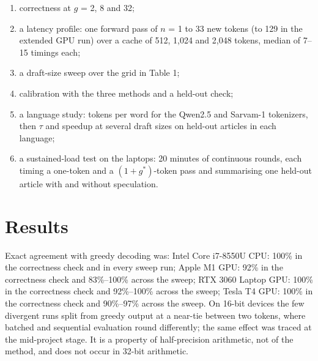 \documentclass[11pt,a4paper]{article}
\begin{document}
\begin{enumerate}
  \item correctness at $g$ = 2, 8 and 32;
  \item a latency profile: one forward pass of $n$ = 1 to 33 new tokens (to 129 in the extended GPU run) over a cache of 512, 1,024 and 2,048 tokens, median of 7--15 timings each;
  \item a draft-size sweep over the grid in Table 1;
  \item calibration with the three methods and a held-out check;
  \item a language study: tokens per word for the Qwen2.5 and Sarvam-1 tokenizers, then $\tau$ and speedup at several draft sizes on held-out articles in each language;
  \item a sustained-load test on the laptops: 20 minutes of continuous rounds, each timing a one-token and a $(1+g^*)$-token pass and summarising one held-out article with and without speculation.
\end{enumerate}
\section{Results}
Exact agreement with greedy decoding was: Intel Core i7-8550U CPU: 100\% in the correctness check and in every sweep run; Apple M1 GPU: 92\% in the correctness check and 83\%--100\% across the sweep; RTX 3060 Laptop GPU: 100\% in the correctness check and 92\%--100\% across the sweep; Tesla T4 GPU: 100\% in the correctness check and 90\%--97\% across the sweep. On 16-bit devices the few divergent runs split from greedy output at a near-tie between two tokens, where batched and sequential evaluation round differently; the same effect was traced at the mid-project stage. It is a property of half-precision arithmetic, not of the method, and does not occur in 32-bit arithmetic.
\end{document}
